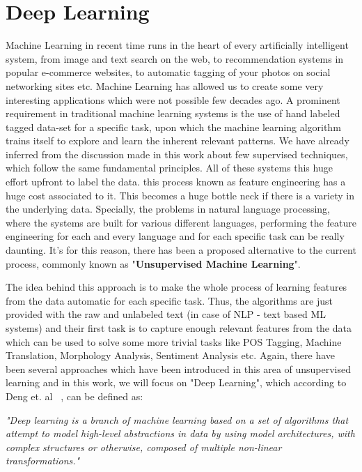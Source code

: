 \chapter{Deep Learning}\label{chapter:deeplearning}
Machine Learning in recent time runs in the heart of every artificially intelligent system, from image and text search on the web, to recommendation systems in popular e-commerce websites, to automatic tagging of your photos on social networking sites etc. Machine Learning has allowed us to create some very interesting applications which were not possible few decades ago. A prominent requirement in traditional machine learning systems is the use of hand labeled tagged data-set for a specific task, upon which the machine learning algorithm trains itself to explore and learn the inherent relevant patterns. We have already inferred from the discussion made in this work about few supervised techniques, which follow the same fundamental principles. All of these systems this huge effort upfront to label the data. this process known as feature engineering has a huge cost associated to it. This becomes a huge bottle neck if there is a variety in the underlying data. Specially, the problems in natural language processing, where the systems are built for various different languages, performing the feature engineering for each and every language and for each specific task can be really daunting.  It's for this reason, there has been a proposed alternative to the current process, commonly known as "\textbf{Unsupervised Machine Learning}". 
\newline

The idea behind this approach is to make the whole process of learning features from the data automatic for each specific task. Thus, the algorithms are just provided with the raw and unlabeled text (in case of NLP - text based ML systems) and their first task is to capture enough relevant features from the data which can be used to solve some more trivial tasks like POS Tagging, Machine Translation, Morphology Analysis, Sentiment Analysis etc. Again, there have been several approaches which have been introduced in this area of unsupervised learning and in this work, we will focus on "Deep Learning", which according to Deng et. al ~\parencite{deng}, can be defined as:

\begin{center}
\textit{"Deep learning is a branch of machine learning based on a set of algorithms that attempt to model high-level abstractions in data by using model architectures, with complex structures or otherwise, composed of multiple non-linear transformations."}
\end{center}

